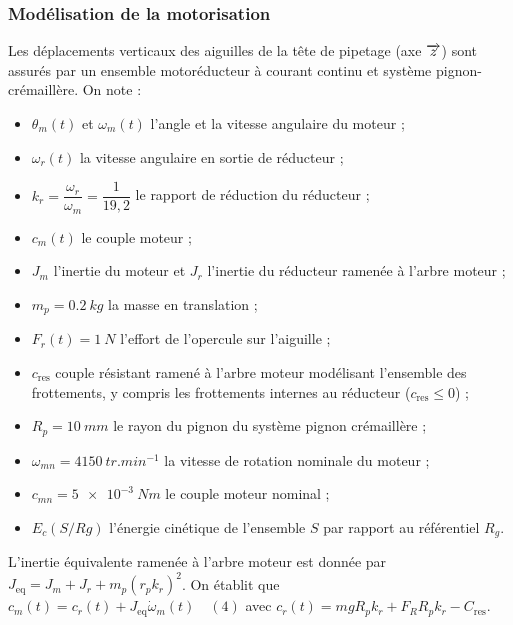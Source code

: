 \documentclass[10pt,fleqn]{article} %
\begin{document}
\begin{multicols}{2}
\subsubsection*{Modélisation de la motorisation}

Les déplacements verticaux des aiguilles de la tête de pipetage (axe $\overrightarrow{z}$) sont assurés par un ensemble motoréducteur à courant continu et système pignon-crémaillère.
On note :
\begin{itemize}
\item $ \theta_m(t)$ et $\omega_m(t)$ l’angle et la vitesse angulaire du moteur ;
\item $\omega_r(t)$ la vitesse angulaire en sortie de réducteur ;
\item $k_r=\dfrac{\omega_r}{\omega_m}=\dfrac{1}{19,2}$ le rapport de réduction du réducteur ;
\item $c_m(t)$ le couple moteur ;
\item $J_m$ l’inertie du moteur et $J_r$ l'inertie du réducteur ramenée à l’arbre moteur ;
\item $m_p = \SI{0,2}{kg}$ la masse en translation ;
\item $F_r(t) = \SI{1}{N}$ l’effort de l’opercule sur l’aiguille ;
\item $c_{\text{res}}$ couple résistant ramené à l’arbre moteur modélisant l’ensemble des frottements, y compris les frottements internes au réducteur ($c_{\text{res}}\leq 0$) ;
\item $R_p = \SI{10}{mm}$ le rayon du pignon du système pignon crémaillère ;
\item $\omega_{mn} = \SI{4 150}{tr.min^{-1}}$ la vitesse de rotation nominale du moteur ;
\item $c_{mn}= \SI{5e-3}{Nm}$ le couple moteur nominal ;
\item $E_c\left(S/Rg\right)$ l’énergie cinétique de l’ensemble $S$ par rapport au référentiel $R_g$.
\end{itemize}

L'inertie équivalente ramenée à l'arbre moteur est donnée par $J_{\text{eq}}=J_m+J_r+m_p\left(r_p k_r \right)^2$. On établit que $c_m(t)=c_r(t)+J_{\text{eq}}\dot{\omega}_m(t) \quad (4)$ avec $c_r(t)=mgR_p k_r + F_R R_pk_r - C_{\text{res}}$.




\end{multicols}
\end{document}
